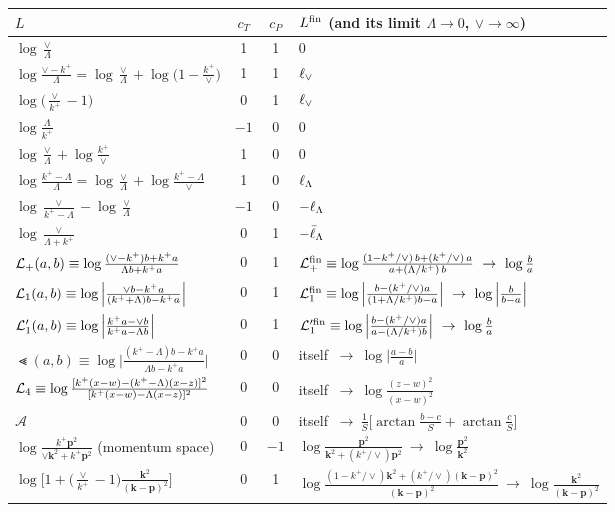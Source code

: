 \begin{table}[!htbp]
\centering
\small
\renewcommand{\arraystretch}{1.6}
\begin{tabular}{p{6.0cm}ccp{6.4cm}}
\toprule
$L$ & $c_T$ & $c_P$ & $L^{\rm fin}$ (and its limit $\Lambda\to0$, $\vee\to\infty$)\\
\midrule
$\log\frac{\vee}{\Lambda}$ & 1 & 1 & 0\\
$\log\frac{\vee-k^+}{\Lambda}=\log\frac{\vee}{\Lambda}+\log\big(1-\frac{k^+}{\vee}\big)$ & 1 & 1 & $\ell_{\vee}$\\
$\log\big(\frac{\vee}{k^+}-1\big)$ & 0 & 1 & $\ell_{\vee}$\\
$\log\frac{\Lambda}{k^+}$ & $-1$ & 0 & 0\\
$\log\frac{\vee}{\Lambda}+\log\frac{k^+}{\vee}$ & 1 & 0 & 0\\
$\log\frac{k^+-\Lambda}{\Lambda}=\log\frac{\vee}{\Lambda}+\log\frac{k^+-\Lambda}{\vee}$ & 1 & 0 & $\ell_{\Lambda}$\\
$\log\frac{\vee}{k^+-\Lambda}-\log\frac{\vee}{\Lambda}$ & $-1$ & 0 & $-\ell_{\Lambda}$\\
$\log\frac{\vee}{\Lambda+k^+}$ & 0 & 1 & $-\bar\ell_{\Lambda}$\\
$\mathcal{L}_{+}(a,b)\equiv\log\frac{(\vee-k^+)b+k^+a}{\Lambda b+k^+a}$ & 0 & 1 & $\Lp^{\rm fin}\equiv\log\frac{(1-k^+/\vee)\,b+(k^+/\vee)\,a}{a+(\Lambda/k^+)\,b}\ \to\ \log\frac ba$\\
$\mathcal{L}_{1}(a,b)\equiv\log\Big|\frac{\vee b-k^+a}{(k^++\Lambda)b-k^+a}\Big|$ & 0 & 1 & $\Lo^{\rm fin}\equiv\log\Big|\frac{b-(k^+/\vee)a}{(1+\Lambda/k^+)b-a}\Big|\ \to\ \log\Big|\frac{b}{b-a}\Big|$\\
$\mathcal{L}_{1}'(a,b)\equiv\log\Big|\frac{k^+a-\vee b}{k^+a-\Lambda b}\Big|$ & 0 & 1 & $\Lop^{\rm fin}\equiv\log\Big|\frac{b-(k^+/\vee)a}{a-(\Lambda/k^+)b}\Big|\ \to\ \log\frac ba$\\
$\Lt(a,b)\equiv\log\Big|\frac{(k^+-\Lambda)b-k^+a}{\Lambda b-k^+a}\Big|$ & 0 & 0 & itself $\ \to\ \log\Big|\frac{a-b}{a}\Big|$\\
$\mathcal{L}_{4}\equiv\log\frac{[k^+(x-w)-(k^+-\Lambda)(x-z)]^2}{[k^+(x-w)-\Lambda(x-z)]^2}$ & 0 & 0 & itself $\ \to\ \log\frac{(z-w)^2}{(x-w)^2}$\\
$\mathcal A$ & 0 & 0 & itself $\ \to\ \frac1S\big[\arctan\frac{b-c}{S}+\arctan\frac cS\big]$\\
$\log\frac{k^+\mathbf p^2}{\vee\mathbf k^2+k^+\mathbf p^2}$ (momentum space) & 0 & $-1$ & $\log\frac{\mathbf p^2}{\mathbf k^2+(k^+/\vee)\mathbf p^2}\ \to\ \log\frac{\mathbf p^2}{\mathbf k^2}$\\
$\log\big[1+\big(\frac{\vee}{k^+}-1\big)\frac{\mathbf k^2}{(\mathbf k-\mathbf p)^2}\big]$ & 0 & 1 & $\log\frac{(1-k^+/\vee)\mathbf k^2+(k^+/\vee)(\mathbf k-\mathbf p)^2}{(\mathbf k-\mathbf p)^2}\ \to\ \log\frac{\mathbf k^2}{(\mathbf k-\mathbf p)^2}$\\

\end{tabular}
\end{table}
